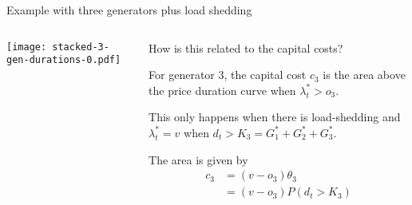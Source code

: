 \documentclass[10pt,aspectratio=169,dvipsnames]{beamer}
\def\l{\lambda}
\begin{document}
\begin{frame}{Example with three generators plus load shedding}

\begin{columns}[T]
  \begin{column}{6cm}

\texttt{[image: stacked-3-gen-durations-0.pdf]}

  \end{column}
  \begin{column}{8cm}

    How is this related to the capital costs?

    \vspace{0.5cm}

    For generator 3, the capital cost $c_3$ is the area above the price duration curve when $\l_t^* > o_3$.

    This only happens when there is load-shedding and $\l_t^* = v$ when $d_t > K_3 = G_1^* + G_2^* + G_3^*$.

    The area is given by
    \begin{align*}
      c_3 &  = (v - o_3) \theta_3  \\
      & = (v - o_3)P(d_t > K_3)
    \end{align*}
  \end{column}

\end{columns}

\end{frame}
\end{document}
